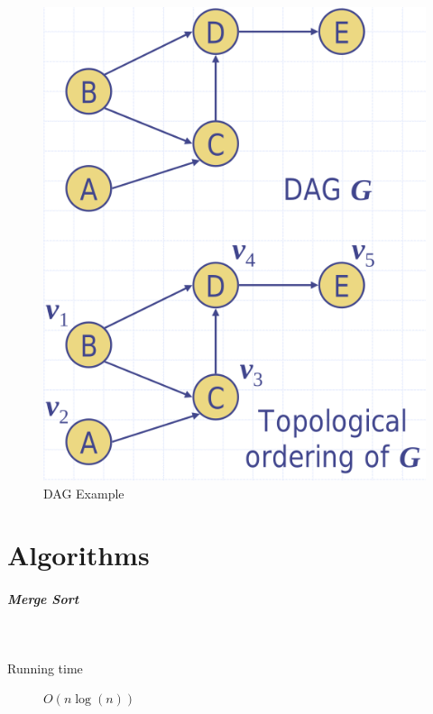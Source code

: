 \documentclass[11pt,twoside,twocolumn,landscape]{article}
\begin{document}
\begin{figure}[htbp]
\centering
\includegraphics[width=.9\linewidth]{img/dag.png}
\caption{\label{fig:org45ff59c}DAG Example}
\end{figure}

\section{Algorithms}
\label{sec:org41f9e46}
\subparagraph{Merge Sort} \
\label{sec:orgbbe3c14}

\begin{description}
\item[{Running time}] \(O(n \log(n))\)
\end{description}
\end{document}
